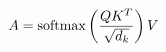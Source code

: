 \documentclass[preview]{standalone}
\begin{document}
\begin{align*}
\special{dvisvgm:raw <g id='unique000'>}A = \text{softmax}\left(\frac{QK^T}{\sqrt{d_k}}\right)V\special{dvisvgm:raw </g>}
\end{align*}
\end{document}
